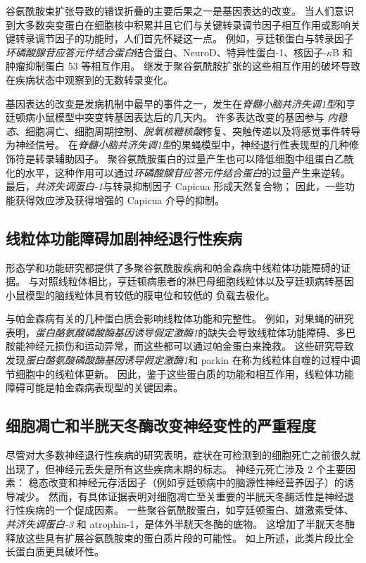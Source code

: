 谷氨酰胺束扩张导致的错误折叠的主要后果之一是基因表达的改变。
当人们意识到大多数突变蛋白在细胞核中积累并且它们与关键转录调节因子相互作用或影响关键转录调节因子的功能时，人们首先怀疑这一点。
例如，亨廷顿蛋白与转录因子\textit{环磷酸腺苷应答元件结合蛋白}结合蛋白、NeuroD、特异性蛋白-1、核因子-$\kappa$B 和肿瘤抑制蛋白 53 等相互作用。
继发于聚谷氨酰胺扩张的这些相互作用的破坏导致在疾病状态中观察到的无数转录变化。


基因表达的改变是发病机制中最早的事件之一，发生在\textit{脊髓小脑共济失调1型}和亨廷顿病小鼠模型中突变转基因表达后的几天内。
许多表达改变的基因参与  \textit{内稳态}、细胞凋亡、细胞周期控制、\textit{脱氧核糖核酸}修复、突触传递以及将感觉事件转导为神经信号。
在\textit{脊髓小脑共济失调1型}的果蝇模型中，神经退行性表现型的几种修饰符是转录辅助因子。
聚谷氨酰胺蛋白的过量产生也可以降低细胞中组蛋白乙酰化的水平，这种作用可以通过\textit{环磷酸腺苷应答元件结合蛋白}的过量产生来逆转。
最后，\textit{共济失调蛋白-1}与转录抑制因子 Capicua 形成天然复合物；
因此，一些功能获得效应涉及获得增强的 Capicua 介导的抑制。



\subsection{线粒体功能障碍加剧神经退行性疾病}

形态学和功能研究都提供了多聚谷氨酰胺疾病和帕金森病中线粒体功能障碍的证据。
与对照线粒体相比，亨廷顿病患者的淋巴母细胞线粒体以及亨廷顿病转基因小鼠模型的脑线粒体具有较低的膜电位和较低的  负载去极化。


与帕金森病有关的几种蛋白质会影响线粒体功能和完整性。
例如，对果蝇的研究表明，\textit{蛋白酪氨酸磷酸酶基因诱导假定激酶1}的缺失会导致线粒体功能障碍、多巴胺能神经元损伤和运动异常，而这些都可以通过帕金蛋白来挽救。
这些研究导致发现\textit{蛋白酪氨酸磷酸酶基因诱导假定激酶1}和 parkin 在称为线粒体自噬的过程中调节细胞中的线粒体更新。
因此，鉴于这些蛋白质的功能和相互作用，线粒体功能障碍可能是帕金森病表现型的关键因素。



\subsection{细胞凋亡和半胱天冬酶改变神经变性的严重程度}

尽管对大多数神经退行性疾病的研究表明，症状在可检测到的细胞死亡之前很久就出现了，但神经元丢失是所有这些疾病末期的标志。
神经元死亡涉及 2 个主要因素： 稳态改变和神经元存活因子（例如亨廷顿病中的脑源性神经营养因子）的诱导减少。
然而，有具体证据表明对细胞凋亡至关重要的半胱天冬酶活性是神经退行性疾病的一个促成因素。
一些聚谷氨酰胺蛋白，如亨廷顿蛋白、雄激素受体、\textit{共济失调蛋白-3} 和 atrophin-1，是体外半胱天冬酶的底物。
这增加了半胱天冬酶释放这些具有扩展谷氨酰胺束的蛋白质片段的可能性。
如上所述，此类片段比全长蛋白质更具破坏性。


